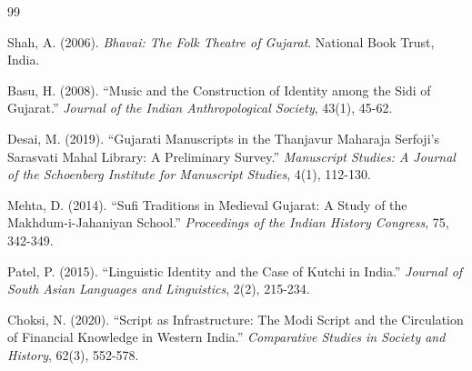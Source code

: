 \documentclass[12pt]{article}
\begin{document}
\newpage
\begin{thebibliography}{99}

  Shah, A. (2006). \textit{Bhavai: The Folk Theatre of Gujarat}. National Book Trust, India.

  Basu, H. (2008). ``Music and the Construction of Identity among the Sidi of Gujarat.'' \textit{Journal of the Indian Anthropological Society}, 43(1), 45-62.

  Desai, M. (2019). ``Gujarati Manuscripts in the Thanjavur Maharaja Serfoji's Sarasvati Mahal Library: A Preliminary Survey.'' \textit{Manuscript Studies: A Journal of the Schoenberg Institute for Manuscript Studies}, 4(1), 112-130.

  Mehta, D. (2014). ``Sufi Traditions in Medieval Gujarat: A Study of the Makhdum-i-Jahaniyan School.'' \textit{Proceedings of the Indian History Congress}, 75, 342-349.

  Patel, P. (2015). ``Linguistic Identity and the Case of Kutchi in India.'' \textit{Journal of South Asian Languages and Linguistics}, 2(2), 215-234.

  Choksi, N. (2020). ``Script as Infrastructure: The Modi Script and the Circulation of Financial Knowledge in Western India.'' \textit{Comparative Studies in Society and History}, 62(3), 552-578.

\end{thebibliography}
\end{document}
